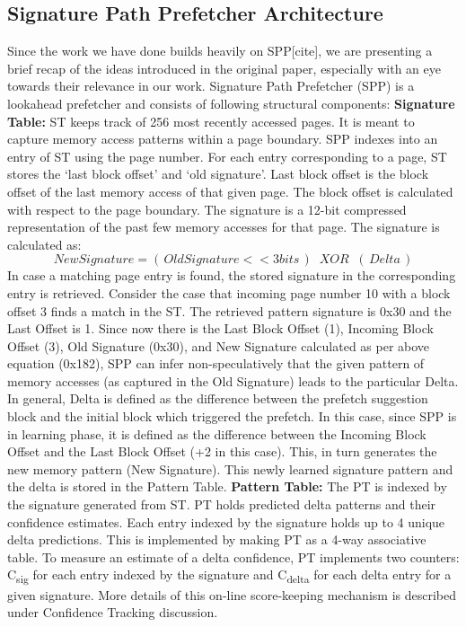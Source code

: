 \documentclass{sig-alternate}
\begin{document}
\subsection{Signature Path Prefetcher Architecture}
Since the work we have done builds heavily on SPP[cite], we are presenting a brief recap of the ideas introduced in the original paper, especially with an eye towards their relevance in our work. 
Signature Path Prefetcher (SPP) is a lookahead prefetcher and consists of following structural components:
\newline
\newline
\textbf{Signature Table:} ST keeps track of 256 most recently accessed pages. 
It is meant to capture memory access patterns within a page boundary. 
SPP indexes into an entry of ST using the page number. 
For each entry corresponding to a page, ST stores the `last block offset' and `old signature'. 
Last block offset is the block offset of the last memory access of that given page. 
The block offset is calculated with respect to the page boundary. 
The signature is a 12-bit compressed representation of the past few memory accesses for that page. 
The signature is calculated as:
$$New Signature = (\,Old Signature << 3 bits\,) \;\;XOR\;\; (\,Delta\,)$$ 
In case a matching page entry is found, the stored signature in the corresponding entry is retrieved.
\newline
\newline
Consider the case that incoming page number 10 with a block offset 3 finds a match in the ST. 
The retrieved pattern signature is 0x30 and the Last Offset is 1. 
Since now there is the Last Block Offset (1), Incoming Block Offset (3), Old Signature (0x30), and New Signature calculated as per above equation (0x182), SPP can infer non-speculatively that the given pattern of memory accesses (as captured in the Old Signature) leads to the particular Delta. 
In general, Delta is defined as the difference between the prefetch suggestion block and the initial block which triggered the prefetch. 
In this case, since SPP is in learning phase, it is defined as the difference between the Incoming Block Offset and the Last Block Offset (+2 in this case). 
This, in turn generates the new memory pattern (New Signature). 
This newly learned signature pattern and the delta is stored in the Pattern Table.
\newline
\newline
\textbf{Pattern Table:} The PT is indexed by the signature generated from ST. 
PT holds predicted delta patterns and their confidence estimates. 
Each entry indexed by the signature holds up to 4 unique delta predictions. 
This is implemented by making PT as a 4-way associative table. 
To measure an estimate of a delta confidence, PT implements two counters: C\textsubscript{sig} for each entry indexed by the signature and C\textsubscript{delta} for each delta entry for a given signature. 
More details of this on-line score-keeping mechanism is described under Confidence Tracking discussion.
\end{document}
